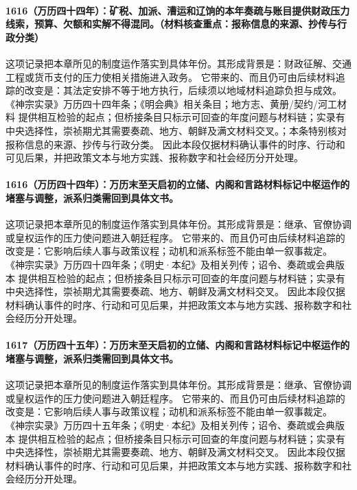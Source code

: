 \paragraph{1616（万历四十四年）：矿税、加派、漕运和辽饷的本年奏疏与账目提供财政压力线索，预算、欠额和实解不得混同。（材料核查重点：报称信息的来源、抄传与行政分类）} 这项记录把本章所见的制度运作落实到具体年份。其形成背景是：财政征解、交通工程或货币支付的压力使相关措施进入政务。 它带来的、而且仍可由后续材料追踪的改变是：其法定安排不等于地方执行，后续须以地域材料追踪负担与成效。 《神宗实录》万历四十四年条；《明会典》相关条目；地方志、黄册/契约/河工材料 提供相互检验的起点；但桥接条目只标示可回查的年度问题与材料链；实录有中央选择性，崇祯期尤其需要奏疏、地方、朝鲜及满文材料交叉。；本条特别核对报称信息的来源、抄传与行政分类。 因此本段仅据材料确认事件的时序、行动和可见后果，并把政策文本与地方实践、报称数字和社会经历分开处理。

\paragraph{1616（万历四十四年）：万历末至天启初的立储、内阁和言路材料标记中枢运作的堵塞与调整，派系归类需回到具体文书。} 这项记录把本章所见的制度运作落实到具体年份。其形成背景是：继承、官僚协调或皇权运作的压力使问题进入朝廷程序。 它带来的、而且仍可由后续材料追踪的改变是：它影响后续人事与政策议程；动机和派系标签不能由单一叙事裁定。 《神宗实录》万历四十四年条；《明史·本纪》及相关列传；诏令、奏疏或会典版本 提供相互检验的起点；但桥接条目只标示可回查的年度问题与材料链；实录有中央选择性，崇祯期尤其需要奏疏、地方、朝鲜及满文材料交叉。 因此本段仅据材料确认事件的时序、行动和可见后果，并把政策文本与地方实践、报称数字和社会经历分开处理。

\paragraph{1617（万历四十五年）：万历末至天启初的立储、内阁和言路材料标记中枢运作的堵塞与调整，派系归类需回到具体文书。} 这项记录把本章所见的制度运作落实到具体年份。其形成背景是：继承、官僚协调或皇权运作的压力使问题进入朝廷程序。 它带来的、而且仍可由后续材料追踪的改变是：它影响后续人事与政策议程；动机和派系标签不能由单一叙事裁定。 《神宗实录》万历四十五年条；《明史·本纪》及相关列传；诏令、奏疏或会典版本 提供相互检验的起点；但桥接条目只标示可回查的年度问题与材料链；实录有中央选择性，崇祯期尤其需要奏疏、地方、朝鲜及满文材料交叉。 因此本段仅据材料确认事件的时序、行动和可见后果，并把政策文本与地方实践、报称数字和社会经历分开处理。

